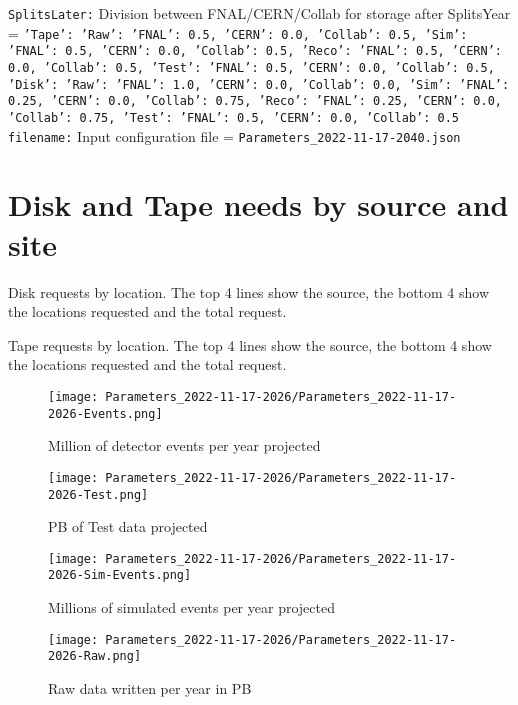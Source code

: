 {\tt SplitsLater:} Division between FNAL/CERN/Collab for storage after SplitsYear = {\tt {'Tape': {'Raw': {'FNAL': 0.5, 'CERN': 0.0, 'Collab': 0.5}, 'Sim': {'FNAL': 0.5, 'CERN': 0.0, 'Collab': 0.5}, 'Reco': {'FNAL': 0.5, 'CERN': 0.0, 'Collab': 0.5}, 'Test': {'FNAL': 0.5, 'CERN': 0.0, 'Collab': 0.5}}, 'Disk': {'Raw': {'FNAL': 1.0, 'CERN': 0.0, 'Collab': 0.0}, 'Sim': {'FNAL': 0.25, 'CERN': 0.0, 'Collab': 0.75}, 'Reco': {'FNAL': 0.25, 'CERN': 0.0, 'Collab': 0.75}, 'Test': {'FNAL': 0.5, 'CERN': 0.0, 'Collab': 0.5}}}} \\
{\tt filename:} Input configuration file = {\tt Parameters\_2022-11-17-2040.json} \\
\section{Disk and Tape needs by source and site}
\begin{table}[h]
\centering{}\label{tab:Cumulative-Disk
}
\caption{Disk requests by location. The top 4 lines show the source, the bottom 4 show the locations requested and the total request.}
\end{table}
\begin{table}[h]
\centering{}\label{tab:Cumulative-Tape
}
\caption{Tape requests by location. The top 4 lines show the source, the bottom 4 show the locations requested and the total request.}
\end{table}
\clearpage
\begin{figure}[h]
\centering\texttt{[image: Parameters\_2022-11-17-2026/Parameters\_2022-11-17-2026-Events.png]}\label{fig:Events}
\caption{Million of detector events per year projected}
\end{figure}
\begin{figure}[h]
\centering\texttt{[image: Parameters\_2022-11-17-2026/Parameters\_2022-11-17-2026-Test.png]}\label{fig:Test}
\caption{PB of Test data projected}
\end{figure}
\begin{figure}[h]
\centering\texttt{[image: Parameters\_2022-11-17-2026/Parameters\_2022-11-17-2026-Sim-Events.png]}\label{fig:Sim-Events}
\caption{Millions of simulated events per year projected}
\end{figure}
\begin{figure}[h]
\centering\texttt{[image: Parameters\_2022-11-17-2026/Parameters\_2022-11-17-2026-Raw.png]}\label{fig:Raw}
\caption{Raw data written per year in PB}
\end{figure}
